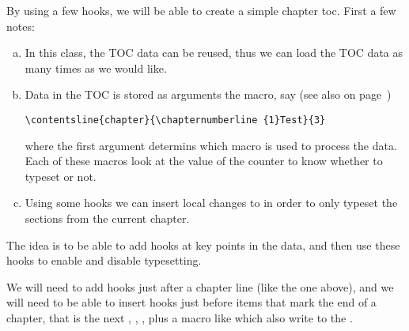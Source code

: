 \begin{sniplet}
  \label{snip:chaptertoc}

  By using a few hooks, we will be able to create a simple chapter
  toc. First a few notes:
  \begin{enumerate}[(a)]
    \setlength\itemsep{0.5em}
  \item In this class, the TOC data can be reused, thus we can load
    the TOC data as many times as we would like.
  \item Data in the TOC is stored as arguments the 
    macro, say (see also  on
    page~\pageref{fig:tocloflotfiles})
\begin{verbatim}
\contentsline{chapter}{\chapternumberline {1}Test}{3}
\end{verbatim}
   where the first argument determins which macro is used to process
   the data. Each of these macros look at the value of the 
   counter to know whether to typeset or not. 
 \item Using some hooks we can insert local changes to 
   in order to only typeset the sections from the current chapter.
 \end{enumerate}
 
The idea is to be able to add hooks at key points in the \toc{} data,
and then use these hooks to enable and disable typesetting.

We will need to add hooks just after a chapter line (like the one
above), and we will need to be able to insert hooks just before items
that mark the end of a chapter, that is the next \cmd{\chapter},
\cmd{\part}, \cmd{\book}, plus a macro like \cmd{\appendixpage} which
also write to the \toc{}.






\end{sniplet}
